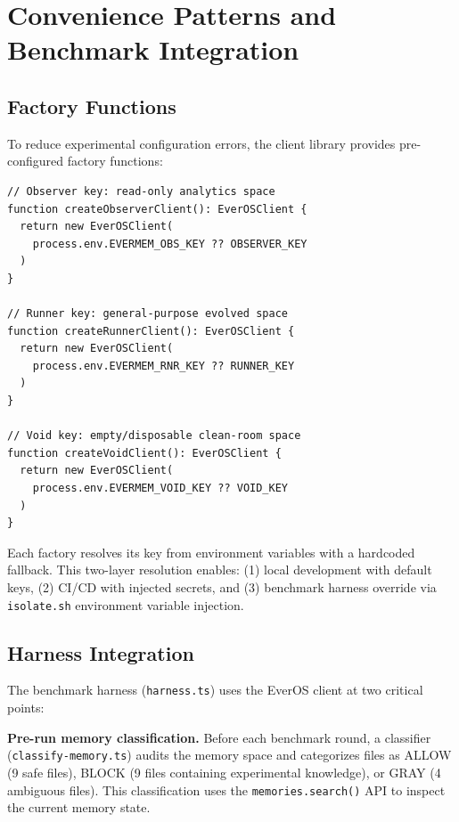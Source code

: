 \documentclass[11pt, a4paper]{article}
\begin{document}
\section{Convenience Patterns and Benchmark Integration}

\subsection{Factory Functions}

To reduce experimental configuration errors, the client library provides pre-configured factory functions:

\begin{lstlisting}[caption={Factory functions (from \texttt{everos.ts}:381--393)}]
// Observer key: read-only analytics space
function createObserverClient(): EverOSClient {
  return new EverOSClient(
    process.env.EVERMEM_OBS_KEY ?? OBSERVER_KEY
  )
}

// Runner key: general-purpose evolved space
function createRunnerClient(): EverOSClient {
  return new EverOSClient(
    process.env.EVERMEM_RNR_KEY ?? RUNNER_KEY
  )
}

// Void key: empty/disposable clean-room space
function createVoidClient(): EverOSClient {
  return new EverOSClient(
    process.env.EVERMEM_VOID_KEY ?? VOID_KEY
  )
}
\end{lstlisting}

Each factory resolves its key from environment variables with a hardcoded fallback. This two-layer resolution enables: (1) local development with default keys, (2) CI/CD with injected secrets, and (3) benchmark harness override via \texttt{isolate.sh} environment variable injection.

\subsection{Harness Integration}

The benchmark harness (\texttt{harness.ts}) uses the EverOS client at two critical points:

\textbf{Pre-run memory classification.} Before each benchmark round, a classifier (\texttt{classify-memory.ts}) audits the memory space and categorizes files as ALLOW (9 safe files), BLOCK (9 files containing experimental knowledge), or GRAY (4 ambiguous files). This classification uses the \texttt{memories.search()} API to inspect the current memory state.
\end{document}
